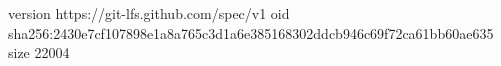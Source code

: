 version https://git-lfs.github.com/spec/v1
oid sha256:2430e7cf107898e1a8a765c3d1a6e385168302ddcb946c69f72ca61bb60ae635
size 22004
